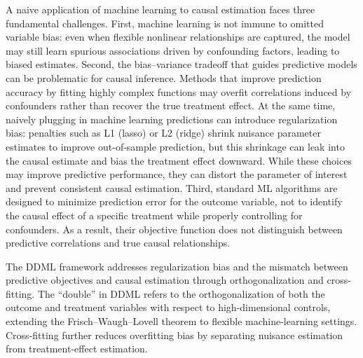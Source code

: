 \documentclass [11pt]{article}
\theoremstyle{plain}
\theoremstyle{definition}
\theoremstyle{remark}
\newcommand{\1}{\bm{1}}
\begin{document}
A naive application of machine learning to causal estimation faces three fundamental challenges. First, machine learning is not immune to omitted variable bias: even when flexible nonlinear relationships are captured, the model may still learn spurious associations driven by confounding factors, leading to biased estimates. Second, the bias–variance tradeoff that guides predictive models can be problematic for causal inference. Methods that improve prediction accuracy by fitting highly complex functions may overfit correlations induced by confounders rather than recover the true treatment effect. At the same time, naively plugging in machine learning predictions can introduce regularization bias: penalties such as L1 (lasso) or L2 (ridge) shrink nuisance parameter estimates to improve out-of-sample prediction, but this shrinkage can leak into the causal estimate and bias the treatment effect downward. While these choices may improve predictive performance, they can distort the parameter of interest and prevent consistent causal estimation. Third, standard ML algorithms are designed to minimize prediction error for the outcome variable, not to identify the causal effect of a specific treatment while properly controlling for confounders. As a result, their objective function does not distinguish between predictive correlations and true causal relationships.

The DDML framework addresses regularization bias and the mismatch between predictive objectives and causal estimation through orthogonalization and cross-fitting. The ``double'' in DDML refers to the orthogonalization of both the outcome and treatment variables with respect to high-dimensional controls, extending the Frisch--Waugh--Lovell theorem to flexible machine-learning settings. Cross-fitting further reduces overfitting bias by separating nuisance estimation from treatment-effect estimation.
\end{document}
